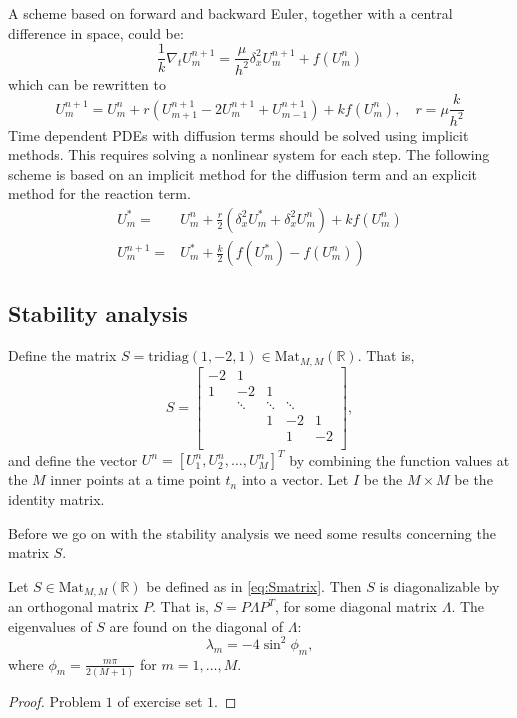 A scheme based on forward and backward Euler,
together with a central difference in space, could be:
$$
  \frac{1}{k}\nabla_tU_{m}^{n+1}=\frac{\mu}{h^2}\delta_x^2U_{m}^{n+1}+f(U_{m}^{n} )
$$
which can be rewritten to 
\begin{equation}
  \label{eq:scheme}
  U_{m}^{n+1} = U_{m}^{n} + r (U_{m+1}^{n+1}-2U_{m}^{n+1}+U_{m-1}^{n+1}) + kf(U_{m}^{n}), \quad r = \mu\frac{k}{h^2}
\end{equation}
Time dependent PDEs with diffusion terms should be solved using implicit methods.
This requires solving a nonlinear system for each step.
The following scheme is based on an implicit method
for the diffusion term and an explicit method for the reaction term.
\begin{align}
  \label{eq:scheme_implicit_eq}
    U_{m}^{*} =& U_{m}^{n} +\frac{r}{2}(\delta_x^2 U_{m}^{*} + \delta_x^2 U_{m}^{n} ) + kf(U_{m}^{n}) \\
  \label{eq:scheme_explicit_eq}
    U_{m}^{n+1} =& U_{m}^{*} + \frac{k}{2}(f(U_{m}^{*}) - f(U_{m}^{n}))
\end{align}

\subsection{Stability analysis}

Define the matrix \( S = \text{tridiag}(1, -2, 1) \in \text{Mat}_{M,M}(\mathbb{R}) \).
That is,
\begin{equation}
  \label{eq:Smatrix}
  S = 
  \begin{bmatrix}
    -2 & 1 &  &  & \\
    1& -2 & 1 &  & \\
     & \ddots & \ddots & \ddots & \\
     &  & 1 & -2 & 1\\
     &  &  & 1 & -2\\
  \end{bmatrix},
\end{equation}
and define the vector \( U^n = [U_1^n, U_2^n, \dots, U_M^n]^T \)
by combining the function values at the \( M \) inner points
at a time point \( t_n \) into a vector.
Let \( I \) be the \( M \times M \) be the identity matrix.

Before we go on with the stability analysis we need some results
concerning the matrix \( S \).

\begin{lemma}
  \label{lemma:S_diagonalizable}
  Let \( S \in \text{Mat}_{M,M}(\mathbb{R}) \) be defined as in \eqref{eq:Smatrix}.
  Then \( S \) is diagonalizable by an orthogonal matrix \( P \).
  That is, \( S = P \Lambda P^T \), for some diagonal matrix \( \Lambda \).
  The eigenvalues of \( S \) are found on the diagonal of \( \Lambda \):
  \[
    \lambda_m = - 4 \sin^2 \phi_m,
  \]
  where \( \phi_m = \frac{m \pi}{2(M+1)} \) for \(m = 1, \dots, M. \)
\end{lemma}
\begin{proof}
    Problem \( 1 \) of exercise set \( 1 \).
\end{proof}

